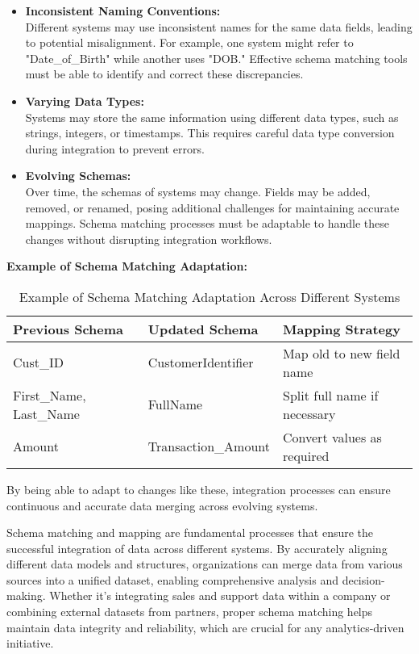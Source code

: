 \documentclass[12pt]{article}
\begin{document}
\begin{itemize}
    \item \textbf{Inconsistent Naming Conventions:} \\
    Different systems may use inconsistent names for the same data fields, leading to potential misalignment. For example, one system might refer to "Date\_of\_Birth" while another uses "DOB." Effective schema matching tools must be able to identify and correct these discrepancies.

    \item \textbf{Varying Data Types:} \\
    Systems may store the same information using different data types, such as strings, integers, or timestamps. This requires careful data type conversion during integration to prevent errors.

    \item \textbf{Evolving Schemas:} \\
    Over time, the schemas of systems may change. Fields may be added, removed, or renamed, posing additional challenges for maintaining accurate mappings. Schema matching processes must be adaptable to handle these changes without disrupting integration workflows.
\end{itemize}

\textbf{Example of Schema Matching Adaptation:}

\begin{table}[h]
    \centering
    \begin{tabular}{|p{4cm}|p{4cm}|p{5cm}|}
        \hline
        \textbf{Previous Schema} & \textbf{Updated Schema} & \textbf{Mapping Strategy} \\ \hline
        Cust\_ID & CustomerIdentifier & Map old to new field name \\ \hline
        First\_Name, Last\_Name & FullName & Split full name if necessary \\ \hline
        Amount & Transaction\_Amount & Convert values as required \\ \hline
    \end{tabular}
    \caption{Example of Schema Matching Adaptation Across Different Systems}
\end{table}

By being able to adapt to changes like these, integration processes can ensure continuous and accurate data merging across evolving systems.

Schema matching and mapping are fundamental processes that ensure the successful integration of data across different systems. By accurately aligning different data models and structures, organizations can merge data from various sources into a unified dataset, enabling comprehensive analysis and decision-making. Whether it’s integrating sales and support data within a company or combining external datasets from partners, proper schema matching helps maintain data integrity and reliability, which are crucial for any analytics-driven initiative.
\end{document}
